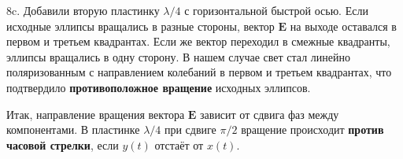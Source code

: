 8c. Добавили вторую пластинку \(\lambda/4\) с горизонтальной быстрой осью. Если исходные эллипсы вращались в разные стороны, вектор \( \mathbf{E} \) на выходе оставался в первом и третьем квадрантах. Если же вектор переходил в смежные квадранты, эллипсы вращались в одну сторону. В нашем случае свет стал линейно поляризованным с направлением колебаний в первом и третьем квадрантах, что подтвердило \textbf{противоположное вращение} исходных эллипсов.

Итак, направление вращения вектора \( \mathbf{E} \) зависит от сдвига фаз между компонентами. В пластинке \(\lambda/4\) при сдвиге \(\pi/2\) вращение происходит \textbf{против часовой стрелки}, если \( y(t) \) отстаёт от \( x(t) \).